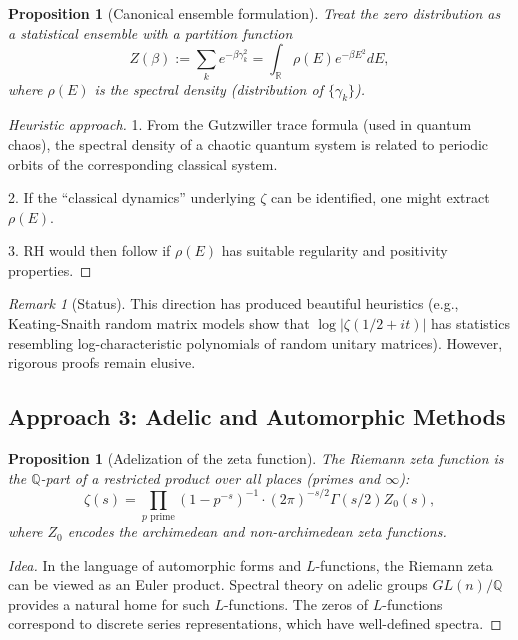 \documentclass[11pt]{article}
\theoremstyle{plain}
\newtheorem{proposition}[theorem]{Proposition}
\theoremstyle{definition}
\theoremstyle{remark}
\newtheorem{remark}[theorem]{Remark}
\begin{document}
\begin{proposition}[Canonical ensemble formulation]
Treat the zero distribution as a statistical ensemble with a partition function
\[
Z(\beta) := \sum_k e^{-\beta\gamma_k^2} = \int_{\mathbb{R}} \rho(E) e^{-\beta E^2} dE,
\]
where $\rho(E)$ is the spectral density (distribution of $\{\gamma_k\}$).
\end{proposition}

\begin{proof}[Heuristic approach]
1. From the Gutzwiller trace formula (used in quantum chaos), the spectral density of a chaotic quantum system
is related to periodic orbits of the corresponding classical system.

2. If the ``classical dynamics'' underlying $\zeta$ can be identified, one might extract $\rho(E)$.

3. RH would then follow if $\rho(E)$ has suitable regularity and positivity properties.
\end{proof}

\begin{remark}[Status]
This direction has produced beautiful heuristics (e.g., Keating-Snaith random matrix models show that
$\log|\zeta(1/2+it)|$ has statistics resembling log-characteristic polynomials of random unitary matrices).
However, rigorous proofs remain elusive.
\end{remark}

\subsection{Approach 3: Adelic and Automorphic Methods}

\begin{proposition}[Adelization of the zeta function]
The Riemann zeta function is the $\mathbb{Q}$-part of a restricted product over all places (primes and $\infty$):
\[
\zeta(s) = \prod_{p \text{ prime}} (1-p^{-s})^{-1} \cdot (2\pi)^{-s/2} \Gamma(s/2) Z_0(s),
\]
where $Z_0$ encodes the archimedean and non-archimedean zeta functions.
\end{proposition}

\begin{proof}[Idea]
In the language of automorphic forms and $L$-functions, the Riemann zeta can be viewed as an Euler product.
Spectral theory on adelic groups $GL(n)/\mathbb{Q}$ provides a natural home for such $L$-functions.
The zeros of $L$-functions correspond to discrete series representations, which have well-defined spectra.
\end{proof}
\end{document}
